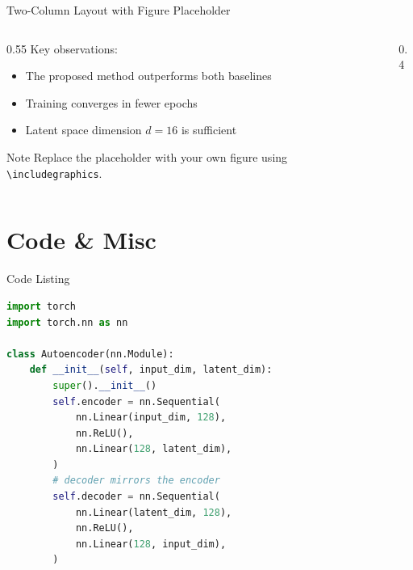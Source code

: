 \documentclass[aspectratio=169]{beamer}
\begin{document}
\begin{frame}{Two-Column Layout with Figure Placeholder}
  \begin{columns}[T]
    \begin{column}{0.55\textwidth}
      Key observations:
      \begin{itemize}
        \item The proposed method outperforms both baselines
        \item Training converges in fewer epochs
        \item Latent space dimension $d = 16$ is sufficient
      \end{itemize}

      \vspace{4mm}
      \begin{alertblock}{Note}
        Replace the placeholder with your own figure using \texttt{\textbackslash includegraphics}.
      \end{alertblock}
    \end{column}
    \begin{column}{0.4\textwidth}
      \centering
    \end{column}
  \end{columns}
\end{frame}

\section{Code \& Misc}

\begin{frame}[fragile]{Code Listing}
  \begin{lstlisting}[language=Python]
import torch
import torch.nn as nn

class Autoencoder(nn.Module):
    def __init__(self, input_dim, latent_dim):
        super().__init__()
        self.encoder = nn.Sequential(
            nn.Linear(input_dim, 128),
            nn.ReLU(),
            nn.Linear(128, latent_dim),
        )
        # decoder mirrors the encoder
        self.decoder = nn.Sequential(
            nn.Linear(latent_dim, 128),
            nn.ReLU(),
            nn.Linear(128, input_dim),
        )
  \end{lstlisting}
\end{frame}
\end{document}

